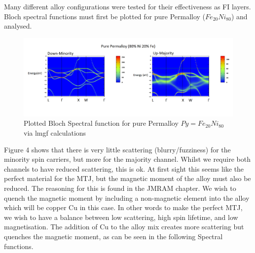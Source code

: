 \documentclass[12pt]{article}
\begin{document}
Many different alloy configurations were tested for their effectiveness as FI layers. Bloch spectral functions must first be plotted for pure Permalloy ($Fe_{20}Ni_{80}$) and analysed. 
\begin{figure}[htp]
    \centering
    \begin{measuredfigure}
    \includegraphics[scale=0.40]{specfunc/purepy}
    \caption{Plotted Bloch Spectral function for pure Permalloy $Py=Fe_{20}Ni_{80}$ via lmgf calculations}
    \end{measuredfigure}
    \end{figure}

Figure 4 shows that there is very little scattering (blurry/fuzziness) for the minority spin carriers, but more for the majority channel. Whilst we require both channels to have reduced scattering, this is ok. At first sight this seems like the perfect material for the MTJ, but the magnetic moment of the alloy must also be reduced. The reasoning for this is found in the JMRAM chapter. We wish to quench the magnetic moment by including a non-magnetic element into the alloy which will be copper Cu in this case. In other words to make the perfect MTJ, we wish to have a balance between low scattering, high spin lifetime, and low magnetisation. The addition of Cu to the alloy mix creates more scattering but quenches the magnetic moment, as can be seen in the following Spectral functions.
\end{document}
